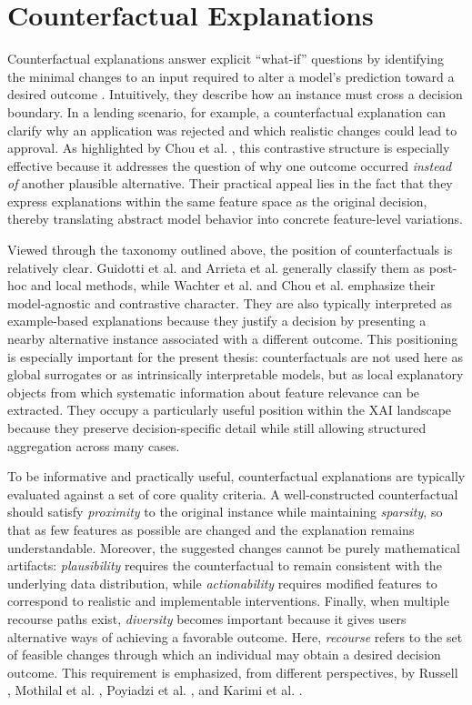 \section{Counterfactual Explanations}
Counterfactual explanations answer explicit \enquote{what-if} questions by identifying the minimal changes to an input required to alter a model's prediction toward a desired outcome \cite{wachter2017counterfactual}. Intuitively, they describe how an instance must cross a decision boundary. In a lending scenario, for example, a counterfactual explanation can clarify why an application was rejected and which realistic changes could lead to approval. As highlighted by Chou et al. \cite{chou2022counterfactuals}, this contrastive structure is especially effective because it addresses the question of why one outcome occurred \emph{instead of} another plausible alternative. Their practical appeal lies in the fact that they express explanations within the same feature space as the original decision, thereby translating abstract model behavior into concrete feature-level variations.

Viewed through the taxonomy outlined above, the position of counterfactuals is relatively clear. Guidotti et al. \cite{guidotti2018survey} and Arrieta et al. \cite{arrieta2020explainable} generally classify them as post-hoc and local methods, while Wachter et al. \cite{wachter2017counterfactual} and Chou et al. \cite{chou2022counterfactuals} emphasize their model-agnostic and contrastive character. They are also typically interpreted as example-based explanations because they justify a decision by presenting a nearby alternative instance associated with a different outcome. This positioning is especially important for the present thesis: counterfactuals are not used here as global surrogates or as intrinsically interpretable models, but as local explanatory objects from which systematic information about feature relevance can be extracted. They occupy a particularly useful position within the XAI landscape because they preserve decision-specific detail while still allowing structured aggregation across many cases.

To be informative and practically useful, counterfactual explanations are typically evaluated against a set of core quality criteria. A well-constructed counterfactual should satisfy \emph{proximity} to the original instance while maintaining \emph{sparsity}, so that as few features as possible are changed and the explanation remains understandable. Moreover, the suggested changes cannot be purely mathematical artifacts: \emph{plausibility} requires the counterfactual to remain consistent with the underlying data distribution, while \emph{actionability} requires modified features to correspond to realistic and implementable interventions. Finally, when multiple recourse paths exist, \emph{diversity} becomes important because it gives users alternative ways of achieving a favorable outcome. Here, \emph{recourse} refers to the set of feasible changes through which an individual may obtain a desired decision outcome. This requirement is emphasized, from different perspectives, by Russell \cite{russell2019efficient}, Mothilal et al. \cite{mothilal2020explaining}, Poyiadzi et al. \cite{poyiadzi2020face}, and Karimi et al. \cite{karimi2022survey}.

